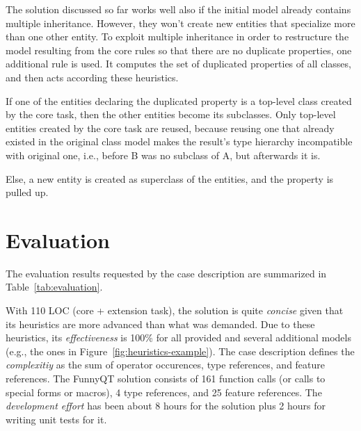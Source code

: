 \documentclass[submission]{eptcs}
\begin{document}
The solution discussed so far works well also if the initial model already
contains multiple inheritance.  However, they won't create new entities that
specialize more than one other entity.  To exploit multiple inheritance in
order to restructure the model resulting from the core rules so that there are
no duplicate properties, one additional rule is used.  It computes the set of
duplicated properties of all classes, and then acts according these heuristics.
\begin{compactenum}
\item If one of the entities declaring the duplicated property is a top-level
  class created by the core task, then the other entities become its
  subclasses.  Only top-level entities created by the core task are reused,
  because reusing one that already existed in the original class model makes
  the result's type hierarchy incompatible with original one, i.e., before B
  was no subclass of A, but afterwards it is.
\item Else, a new entity is created as superclass of the entities, and the
  property is pulled up.
\end{compactenum}


\section{Evaluation}
\label{sec:evaluation}

The evaluation results requested by the case description
\cite{cdrestructcasedesc} are summarized in Table~\ref{tab:evaluation}.

With 110 LOC (core + extension task), the solution is quite \emph{concise}
given that its heuristics are more advanced than what was demanded.  Due to
these heuristics, its \emph{effectiveness} is 100\% for all provided and
several additional models (e.g., the ones in
Figure~\ref{fig:heuristics-example}).  The case description defines the
\emph{complexitiy} as the sum of operator occurences, type references, and
feature references.  The FunnyQT solution consists of 161 function calls (or
calls to special forms or macros), 4 type references, and 25 feature
references.  The \emph{development effort} has been about 8 hours for the
solution plus 2 hours for writing unit tests for it.
\end{document}
